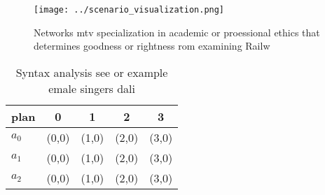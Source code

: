 \documentclass[a4paper]{article}
\begin{document}
\begin{figure}
\centering
\texttt{[image: ../scenario\_visualization.png]}
\caption{Networks mtv specialization in academic or proessional ethics that determines goodness or rightness rom examining Railw
}
\end{figure}
 
\begin{table}
\begin{adjustbox}{width=0.5\columnwidth}
\begin{tabular}{|l|l|l|l|l|}
\hline
\textbf{plan} & \multicolumn{1}{c|}{\textbf{0}} & \multicolumn{1}{c|}{\textbf{1}} & \multicolumn{1}{c|}{\textbf{2}} & \multicolumn{1}{c|}{\textbf{3}} \\ \hline
\textbf{$a_0$}  & (0,0) & (1,0) & (2,0) & (3,0) \\ \hline
\textbf{$a_1$}  & (0,0) & (1,0) & (2,0) & (3,0) \\ \hline
\textbf{$a_2$}  & (0,0) & (1,0) & (2,0) & (3,0) \\ \hline
\end{tabular}
\end{adjustbox}
\caption{Syntax analysis see or example emale singers dali
}
\end{table}
\end{document}
